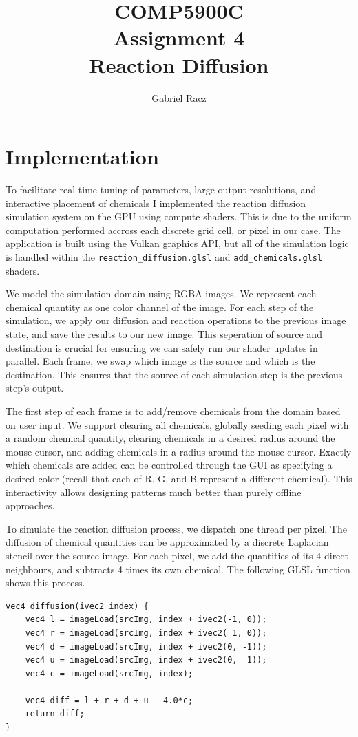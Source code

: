 \documentclass[a4paper, 11pt, titlepage]{article}
\title{COMP5900C\\
Assignment 4\\
Reaction Diffusion}
\author{Gabriel Racz}
\begin{document}
\maketitle
\section{Implementation}
To facilitate real-time tuning of parameters, large output resolutions, and
interactive placement of chemicals I implemented the reaction diffusion
simulation system on the GPU using compute shaders. This is due to the uniform
computation performed accross each discrete grid cell, or pixel in our case. The
application is built using the Vulkan graphics API, but all of the
simulation logic is handled within the \texttt{reaction\_diffusion.glsl} and
\texttt{add\_chemicals.glsl} shaders.

We model the simulation domain using RGBA images. We represent each chemical
quantity as one color channel of the image. For each step of the simulation, we
apply our diffusion and reaction operations to the previous image state, and
save the results to our new image. This seperation of source and destination is
crucial for ensuring we can safely run our shader updates in parallel. Each
frame, we swap which image is the source and which is the destination. This
ensures that the source of each simulation step is the previous step's output.

The first step of each frame is to add/remove chemicals from the domain based on
user input. We support clearing all chemicals, globally seeding each pixel with a random
chemical quantity, clearing chemicals in a desired radius around the mouse
cursor, and adding chemicals in a radius around the mouse cursor. Exactly which
chemicals are added can be controlled through the GUI as specifying a desired
color (recall that each of R, G, and B represent a different chemical). This
interactivity allows designing patterns much better than purely offline
approaches.

To simulate the reaction diffusion process, we dispatch one thread per pixel.
The diffusion of chemical quantities can be approximated by a discrete Laplacian
stencil over the source image. For each pixel, we add the quantities of its 4
direct neighbours, and subtracts 4 times its own chemical. The following GLSL
function shows this process.
\begin{verbatim}
vec4 diffusion(ivec2 index) {
    vec4 l = imageLoad(srcImg, index + ivec2(-1, 0));
    vec4 r = imageLoad(srcImg, index + ivec2( 1, 0));
    vec4 d = imageLoad(srcImg, index + ivec2(0, -1));
    vec4 u = imageLoad(srcImg, index + ivec2(0,  1));
    vec4 c = imageLoad(srcImg, index);

    vec4 diff = l + r + d + u - 4.0*c;
    return diff;
}
\end{verbatim}
\end{document}
